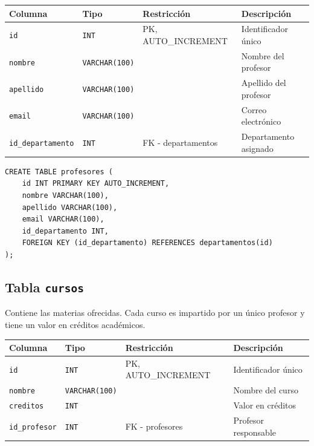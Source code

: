 \documentclass[12pt,a4paper]{article}
\begin{document}
\begin{center}
\begin{tabular}{llll}
  \hline
  \textbf{Columna} & \textbf{Tipo} & \textbf{Restricción} & \textbf{Descripción} \\
  \hline
  \texttt{id}               & \texttt{INT}          & PK, AUTO\_INCREMENT & Identificador único \\
  \texttt{nombre}           & \texttt{VARCHAR(100)} &                     & Nombre del profesor \\
  \texttt{apellido}         & \texttt{VARCHAR(100)} &                     & Apellido del profesor \\
  \texttt{email}            & \texttt{VARCHAR(100)} &                     & Correo electrónico \\
  \texttt{id\_departamento} & \texttt{INT}          & FK - departamentos & Departamento asignado \\
  \hline
\end{tabular}
\end{center}
 
\begin{lstlisting}[caption={SQL -- profesores}]
CREATE TABLE profesores (
    id INT PRIMARY KEY AUTO_INCREMENT,
    nombre VARCHAR(100),
    apellido VARCHAR(100),
    email VARCHAR(100),
    id_departamento INT,
    FOREIGN KEY (id_departamento) REFERENCES departamentos(id)
);
\end{lstlisting}
 
\subsection{Tabla \texttt{cursos}}
 
Contiene las materias ofrecidas. Cada curso es impartido por un único
profesor y tiene un valor en créditos académicos.
 
\begin{center}
\begin{tabular}{llll}
  \hline
  \textbf{Columna} & \textbf{Tipo} & \textbf{Restricción} & \textbf{Descripción} \\
  \hline
  \texttt{id}          & \texttt{INT}          & PK, AUTO\_INCREMENT & Identificador único \\
  \texttt{nombre}      & \texttt{VARCHAR(100)} &                     & Nombre del curso \\
  \texttt{creditos}    & \texttt{INT}          &                     & Valor en créditos \\
  \texttt{id\_profesor} & \texttt{INT}         & FK - profesores    & Profesor responsable \\
  \hline
\end{tabular}
\end{center}
 
\end{document}
